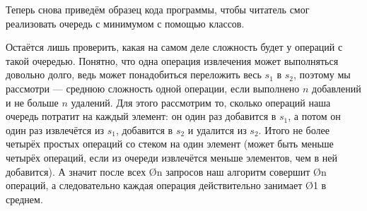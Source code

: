 Теперь снова приведём образец кода программы, чтобы читатель смог реализовать очередь с минимумом с помощью классов.


Остаётся лишь проверить, какая на самом деле сложность будет у операций с такой очередью. Понятно, что одна операция извлечения может выполняться довольно долго, ведь может понадобиться переложить весь $s_1$ в $s_2$, поэтому мы рассмотри  — среднюю сложность одной операции, если выполнено $n$ добавлений и не больше $n$ удалений. Для этого рассмотрим то, сколько операций наша очередь потратит на каждый элемент: он один раз добавится в $s_1$, а потом он один раз извлечётся из $s_1$, добавится в $s_2$ и удалится из $s_2$. Итого не более четырёх простых операций со стеком на один элемент (может быть меньше четырёх операций, если из очереди извлечётся меньше элементов, чем в ней добавится). А значит после всех \O{n} запросов наш алгоритм совершит \O{n} операций, а следовательно каждая операция действительно занимает \O{1} в среднем. 
